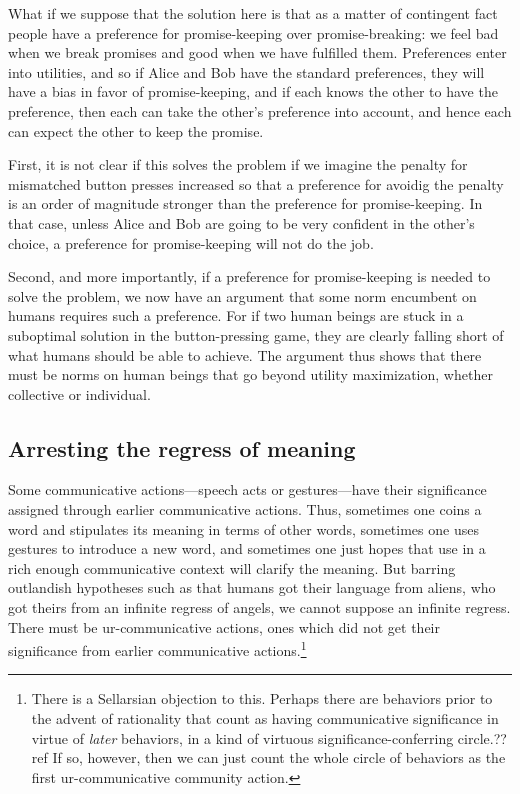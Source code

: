 What if we suppose that the solution here is that as a matter of contingent fact people have a preference for promise-keeping over
promise-breaking: we feel bad when we break promises and good when we have fulfilled them. Preferences enter into utilities,
and so if Alice and Bob have the standard preferences, they will have a bias in favor of promise-keeping, and if each knows the
other to have the preference, then each can take the other's preference into account, and hence each can expect the other to keep
the promise. 

First, it is not clear if this solves the problem if we imagine the penalty for mismatched button presses increased so that a preference
for avoidig the penalty is an order of magnitude stronger than the preference for promise-keeping. In that case, unless Alice and
Bob are going to be very confident in the other's choice, a preference for promise-keeping will not do the job.

Second, and more importantly, if a preference for promise-keeping is needed to solve the problem, we now have an argument that
some norm encumbent on humans requires such a preference. For if two human beings are stuck in a suboptimal solution in the button-pressing
game, they are clearly falling short of what humans should be able to achieve. The argument thus shows that there must be norms on human
beings that go beyond utility maximization, whether collective or individual.

\subsection{Arresting the regress of meaning}
Some communicative actions---speech acts or gestures---have their significance assigned through earlier communicative 
actions. Thus, sometimes one coins a word and stipulates its meaning in terms of other words, sometimes one uses gestures
to introduce a new word, and sometimes one just hopes that use in a rich enough communicative context will clarify the
meaning. But barring outlandish hypotheses such as that humans got their language from aliens, who got theirs from an
infinite regress of angels, we cannot suppose an infinite regress. There must be ur-communicative actions, ones which did not get
their significance from earlier communicative actions.\footnote{There is a Sellarsian objection to this. Perhaps there are 
behaviors prior to the advent of rationality that count as having communicative significance in virtue of \textit{later}
behaviors, in a kind of virtuous significance-conferring circle.??ref If so, however, then we can just count the whole circle 
of behaviors as the first ur-communicative community action.}

